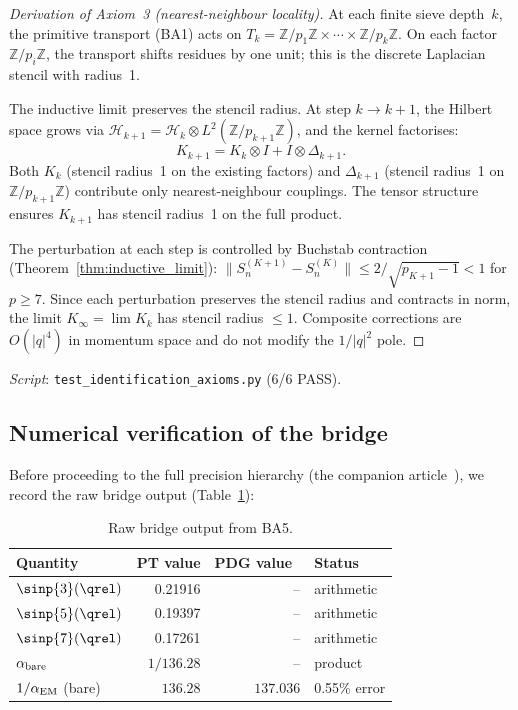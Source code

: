 \documentclass[12pt,a4paper]{article}
\begin{document}
\begin{proof}[Derivation of Axiom~3 (nearest-neighbour locality)]
At each finite sieve depth~$k$, the primitive transport (BA1) acts on
$T_k = \mathbb{Z}/p_1\mathbb{Z} \times \cdots \times
\mathbb{Z}/p_k\mathbb{Z}$.
On each factor $\mathbb{Z}/p_i\mathbb{Z}$, the transport shifts
residues by one unit; this is the discrete Laplacian stencil with
radius~1.

The inductive limit preserves the stencil radius.
At step $k \to k+1$, the Hilbert space grows via
$\mathcal{H}_{k+1} = \mathcal{H}_k \otimes L^2(\mathbb{Z}/p_{k+1}\mathbb{Z})$,
and the kernel factorises:
\begin{equation}
  K_{k+1} = K_k \otimes I + I \otimes \Delta_{k+1}.
  \label{eq:kernel_tensor}
\end{equation}
Both $K_k$ (stencil radius~1 on the existing factors) and
$\Delta_{k+1}$ (stencil radius~1 on $\mathbb{Z}/p_{k+1}\mathbb{Z}$)
contribute only nearest-neighbour couplings.
The tensor structure ensures $K_{k+1}$ has stencil radius~1 on the
full product.

The perturbation at each step is controlled by Buchstab contraction
(Theorem~\ref{thm:inductive_limit}): $\|S_n^{(K+1)} - S_n^{(K)}\|
\leq 2/\!\sqrt{p_{K+1}-1} < 1$ for $p \geq 7$.
Since each perturbation preserves the stencil radius and contracts
in norm, the limit $K_\infty = \lim K_k$ has stencil radius $\leq 1$.
Composite corrections are $O(|q|^4)$ in momentum space and do not
modify the $1/|q|^2$ pole.
\end{proof}

\noindent
\textit{Script}: \texttt{test\_identification\_axioms.py} (6/6 PASS).

\subsection{Numerical verification of the bridge}
\label{sec:ch9_numerical}

Before proceeding to the full precision hierarchy (the companion article~\cite{companion_physics}), we
record the raw bridge output (Table~\ref{tab:bridge_raw}):

\begin{table}[htbp]
\centering
\caption{Raw bridge output from BA5.}
\label{tab:bridge_raw}
\begin{tabular}{lrrl}
\toprule
\textbf{Quantity} & \textbf{PT value} & \textbf{PDG value~\cite{PDG2024}} & \textbf{Status} \\
\midrule
$\sinp{3}(\qrel)$   & 0.21916 & -- & arithmetic \\
$\sinp{5}(\qrel)$   & 0.19397 & -- & arithmetic \\
$\sinp{7}(\qrel)$   & 0.17261 & -- & arithmetic \\
$\alpha_{\rm bare}$  & $1/136.28$ & -- & product \\
$1/\alpha_{\rm EM}$ (bare) & $136.28$ & $137.036$ & 0.55\% error \\
\bottomrule
\end{tabular}
\end{table}
\end{document}
